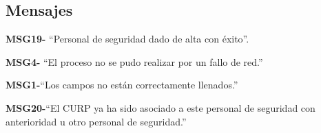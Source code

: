 \subsection{Mensajes}

\begin{Citemize}
    \item {\bf MSG19-} ``Personal de seguridad dado de alta con éxito''.
    \item {\bf MSG4-}  ``El proceso no se pudo realizar por un fallo de red.''
    \item {\bf MSG1-}{``Los campos no están correctamente llenados.''}
    \item {\bf MSG20-}{``El CURP ya ha sido asociado a este personal de seguridad con anterioridad u otro personal de seguridad.''}
    
\end{Citemize}
